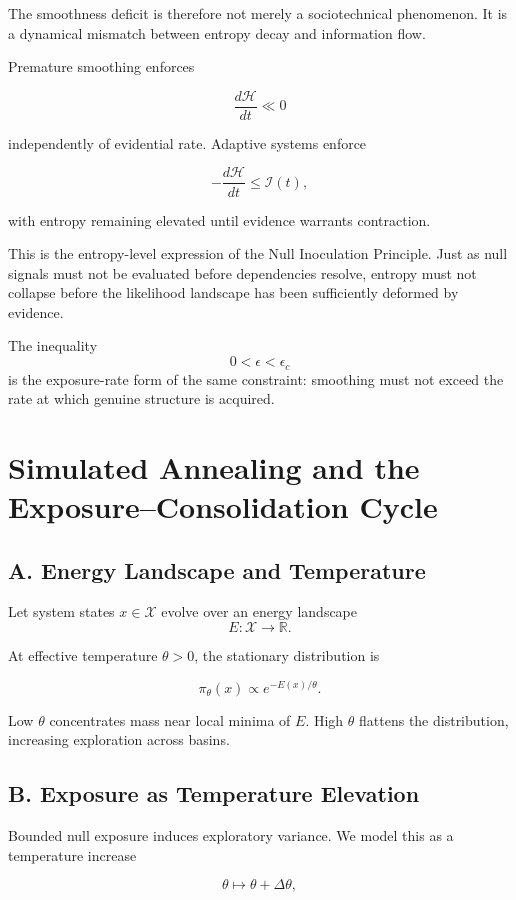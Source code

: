 \documentclass[11pt]{article}
\theoremstyle{remark}
\begin{document}
The smoothness deficit is therefore not merely a sociotechnical phenomenon. It is a dynamical mismatch between entropy decay and information flow.

Premature smoothing enforces

\[
\frac{d\mathcal{H}}{dt} \ll 0
\]

independently of evidential rate. Adaptive systems enforce

\[
- \frac{d\mathcal{H}}{dt}
\le
\mathcal{I}(t),
\]

with entropy remaining elevated until evidence warrants contraction.

This is the entropy-level expression of the Null Inoculation Principle. Just as null signals must not be evaluated before dependencies resolve, entropy must not collapse before the likelihood landscape has been sufficiently deformed by evidence.

The inequality
\[
0 < \epsilon < \epsilon_c
\]
is the exposure-rate form of the same constraint: smoothing must not exceed the rate at which genuine structure is acquired.

\section{Simulated Annealing and the Exposure--Consolidation Cycle}
\label{app:annealing}

\subsection*{A. Energy Landscape and Temperature}

Let system states $x \in \mathcal{X}$ evolve over an energy landscape
\[
E : \mathcal{X} \to \mathbb{R}.
\]

At effective temperature $\theta > 0$, the stationary distribution is

\[
\pi_\theta(x)
\propto
e^{-E(x)/\theta}.
\]

Low $\theta$ concentrates mass near local minima of $E$. High $\theta$ flattens the distribution, increasing exploration across basins.

\subsection*{B. Exposure as Temperature Elevation}

Bounded null exposure induces exploratory variance. We model this as a temperature increase

\[
\theta \mapsto \theta + \Delta\theta,
\]
\end{document}
